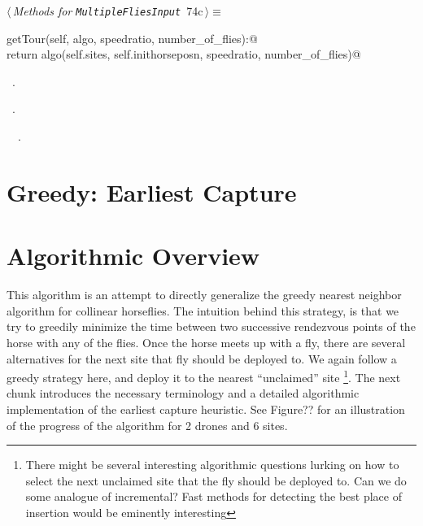 \documentclass[11.5pt]{report}
\begin{document}
\begin{flushleft} \small\label{scrap112}\raggedright\small
{} $\langle\,${\itshape Methods for \verb|MultipleFliesInput|}\nobreak\ {\footnotesize {74c}}$\,\rangle\equiv$
\vspace{-1ex}
\begin{list}{}{} \item
\mbox{}\verb@def getTour(self, algo, speedratio, number_of_flies):@\\
\mbox{}\verb@      return algo(self.sites, self.inithorseposn, speedratio, number_of_flies)@\\
\mbox{}\verb@@{\NWsep}
\end{list}
\vspace{-1.5ex}
\footnotesize
\begin{list}{}{\setlength{\itemsep}{-\parsep}\setlength{\itemindent}{-\leftmargin}}
\item \NWtxtMacroDefBy\ .
\item \NWtxtMacroRefIn\ .
\item \NWtxtIdentsDefed\nobreak\  \verb@getTour@\nobreak\ .
\item{}
\end{list}
\vspace{4ex}
\end{flushleft}

\newpage
\section{ Greedy: Earliest Capture}


\section{Algorithmic Overview}

\newchunk
This algorithm is an attempt to directly generalize the greedy nearest neighbor algorithm for collinear horseflies. 
The intuition behind this strategy, is that we try to greedily minimize the time between two successive rendezvous 
points of the horse with any of the flies. Once the horse meets up with a fly, there are several alternatives for 
the next site that fly should be deployed to. We again follow a greedy strategy here, and deploy 
it to the nearest ``unclaimed'' site \footnote{There might be several interesting
algorithmic questions lurking on how to select the next unclaimed site that the fly should be deployed to. 
Can we do some analogue of incremental? Fast methods for detecting the best place of insertion would be eminently 
interesting}. The next chunk introduces the necessary terminology 
and a detailed algorithmic implementation of the earliest capture heuristic. See Figure?? for an illustration of the 
progress of the algorithm for 2 drones and 6 sites. 
\end{document}

